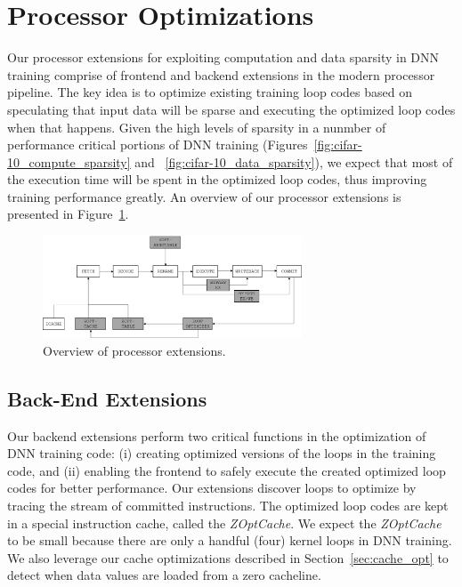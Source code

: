 \section{Processor Optimizations}
\label{sec:processor_opt}

Our processor extensions for exploiting computation and data sparsity in DNN training comprise of frontend and backend extensions in the modern processor pipeline.  The key idea is to optimize existing training loop codes based on speculating that input data will be sparse and executing the optimized loop codes when that happens.  Given the high levels of sparsity in a nunmber of  performance critical portions of DNN training (Figures~\ref{fig:cifar-10_compute_sparsity} and ~\ref{fig:cifar-10_data_sparsity}), we expect that most of the execution time will be spent in the optimized loop codes, thus improving training performance greatly.  An overview of our processor extensions is presented in Figure~\ref{fig:opt_pipeline}.

\begin{figure}[h]
\centering
\includegraphics[height=1.2in]{Figures/pipeline.png}
\caption{Overview of processor extensions.}
\label{fig:opt_pipeline}
\end{figure}

\subsection{Back-End Extensions}
Our backend extensions perform two critical functions in the optimization of DNN training code: (i) creating optimized versions of the loops in the training code, and (ii)  enabling the frontend to safely execute the created optimized loop codes for better performance.  Our extensions discover loops to optimize by tracing the stream of committed instructions. The optimized loop codes are kept in a special instruction cache, called the {\it ZOptCache}. We expect the {\it ZOptCache} to be small because there are only a handful (four) kernel loops in DNN training.   We also leverage our cache optimizations described in Section~\ref{sec:cache_opt} to detect when data values are loaded from a zero cacheline. 

